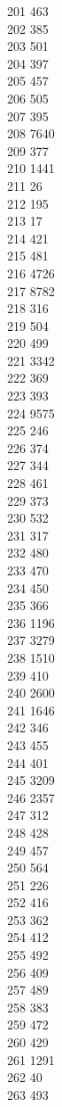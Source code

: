 { 201	463 \\
 202	385 \\
 203	501 \\
 204	397 \\
 205	457 \\
 206	505 \\
 207	395 \\
 208	7640 \\
 209	377 \\
 210	1441 \\
 211	26 \\
 212	195 \\
 213	17 \\
 214	421 \\
 215	481 \\
 216	4726 \\
 217	8782 \\
 218	316 \\
 219	504 \\
 220	499 \\
 221	3342 \\
 222	369 \\
 223	393 \\
 224	9575 \\
 225	246 \\
 226	374 \\
 227	344 \\
 228	461 \\
 229	373 \\
 230	532 \\
 231	317 \\
 232	480 \\
 233	470 \\
 234	450 \\
 235	366 \\
 236	1196 \\
 237	3279 \\
 238	1510 \\
 239	410 \\
 240	2600 \\
 241	1646 \\
 242	346 \\
 243	455 \\
 244	401 \\
 245	3209 \\
 246	2357 \\
 247	312 \\
 248	428 \\
 249	457 \\
 250	564 \\
 251	226 \\
 252	416 \\
 253	362 \\
 254	412 \\
 255	492 \\
 256	409 \\
 257	489 \\
 258	383 \\
 259	472 \\
 260	429 \\
 261	1291 \\
 262	40 \\
 263	493 \\
}
